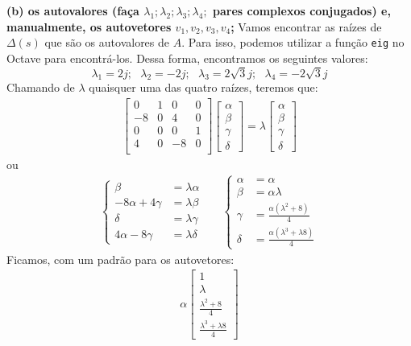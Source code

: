 \documentclass[11pt]{article}
\begin{document}
\textbf{(b) os autovalores (faça $\lambda_1; \lambda_2; \lambda_3; \lambda_4;$ pares complexos conjugados) e, manualmente, os autovetores $v_1, v_2, v_3, v_4$;}
Vamos encontrar as raízes de $\Delta(s)$ que são os autovalores de $A$. Para isso, podemos utilizar a função \texttt{eig} no Octave para encontrá-los. Dessa forma, encontramos os seguintes valores:
\[
  \lambda_1 = 2j;\,\,\,\, \lambda_2 = -2j; \,\,\,\,\lambda_3 = 2\sqrt{3}j; \,\,\,\,\lambda_4 = -2\sqrt{3}j
\]
Chamando de $\lambda$ quaisquer uma das quatro raízes, teremos que:
\begin{align*}
  \begin{bmatrix}
    0 & 1 & 0 & 0 \\
    -8 & 0 & 4 & 0 \\
    0 & 0 & 0 & 1 \\
    4 & 0 & -8 & 0 \\
  \end{bmatrix}
  \begin{bmatrix}
    \alpha\\
    \beta\\
    \gamma\\
    \delta
  \end{bmatrix}
  =
  \lambda
  \begin{bmatrix}
    \alpha\\
    \beta\\
    \gamma\\
    \delta
  \end{bmatrix}
\end{align*}
ou
\begin{align*}
  \begin{cases}
    \beta  &= \lambda \alpha\\
    -8\alpha + 4\gamma &= \lambda \beta\\
    \delta &= \lambda \gamma \\
    4\alpha - 8\gamma &= \lambda \delta
  \end{cases}
  &
  &
  \begin{cases}
    \alpha &= \alpha\\
    \beta  &= \alpha \lambda\\
    \gamma &= \frac{\alpha (\lambda^2 +8)}{4} \\
    \delta &= \frac{\alpha (\lambda^3 + \lambda 8)}{4}
  \end{cases}
\end{align*}
Ficamos, com um padrão para os autovetores:
\begin{align*}
  \alpha
  \begin{bmatrix}
    1\\
    \lambda\\
    \frac{\lambda^2 +8}{4} \\
    \frac{\lambda^3 +\lambda 8}{4}
  \end{bmatrix}
\end{align*}
\end{document}

